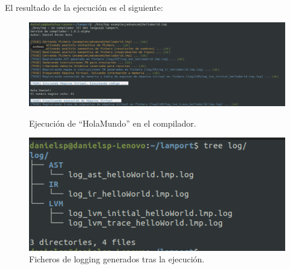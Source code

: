 \noindent
El resultado de la ejecución es el siguiente:
\begin{figure}[h]
  \begin{minipage}{\linewidth}
    \centering
    \includegraphics[width=\linewidth]{images/implementacion/ejecucion/lmp_hola_mundo.png}
    \caption{Ejecución de ``HolaMundo'' en el compilador.}
    \label{fig:ejecucionHolaMundo}
  \end{minipage}
  \vspace{10pt} 
  \begin{minipage}{\linewidth}
    \centering
    \includegraphics[width=\linewidth]{images/implementacion/ejecucion/logs.png}
    \caption{Ficheros de logging generados tras la ejecución.}
    \label{fig:logsHolaMundo}
  \end{minipage}
\end{figure}

\newpage
